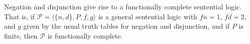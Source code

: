 Negation and disjunction give rise to a functionally complete sentential logic. That is, if $\mathcal{P} = \langle \{n, d\}, P, f, g \rangle$ is a general sentential logic with $fn = 1$, $fd = 2$, and $g$ given by the usual truth tables for negation and disjunction, and if $P$ is finite, then $\mathcal{P}$ is functionally complete.
